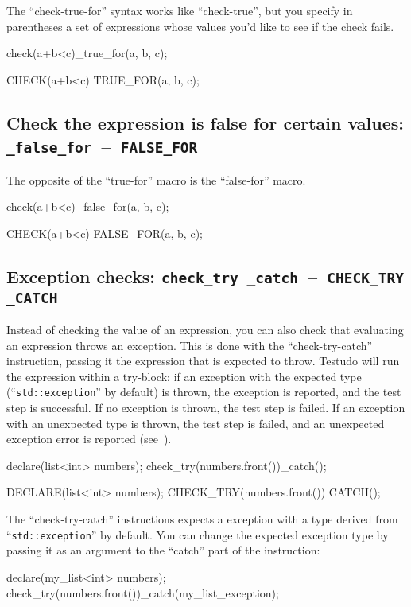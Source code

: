 \documentclass[twoside, a4paper, article]{memoir}
\newcommand*\testudocolor{\color{red!80!blue}}
\newcommand*\testudo[1]{\texttt{\testudocolor{}#1}}
\newcommand*\testudopair[2]{\testudo{#1}~--~\testudo{#2}}
\newcommand\subsectiontestudopair[3]{%
  \subsection[#1]{#1: \testudopair{#2}{#3}}}
\begin{document}
The ``check-true-for'' syntax works like ``check-true'', but you specify in
parentheses a set of expressions whose values you'd like to see if the check
fails.

\begin{cpplisting}
check(a+b<c)_true_for(a, b, c);
\end{cpplisting}

\begin{cpplisting}
CHECK(a+b<c) TRUE_FOR(a, b, c);
\end{cpplisting}

\subsectiontestudopair{Check the expression is false for certain values}%
{\_false\_for}{FALSE\_FOR}
\label{sec:check-expression-false-for}

The opposite of the ``true-for'' macro is the ``false-for'' macro.

\begin{cpplisting}
check(a+b<c)_false_for(a, b, c);
\end{cpplisting}

\begin{cpplisting}
CHECK(a+b<c) FALSE_FOR(a, b, c);
\end{cpplisting}


\subsectiontestudopair{Exception checks}%
  {check\_try \_catch}{CHECK\_TRY \_CATCH}
\label{sec:exception-checks}

Instead of checking the value of an expression, you can also check that
evaluating an expression throws an exception.  This is done with the
``check-try-catch'' instruction, passing it the expression that is expected to
throw.  Testudo will run the expression within a try-block; if an exception
with the expected type (``\texttt{std::exception}'' by default) is thrown, the
exception is reported, and the test step is successful.  If no exception is
thrown, the test step is failed. If an exception with an unexpected type is
thrown, the test step is failed, and an unexpected exception error is reported
(see~).

\begin{cpplisting}
declare(list<int> numbers);
check_try(numbers.front())_catch();
\end{cpplisting}

\begin{cpplisting}
DECLARE(list<int> numbers);
CHECK_TRY(numbers.front()) CATCH();
\end{cpplisting}

The ``check-try-catch'' instructions expects a exception with a type derived
from ``\texttt{std::exception}'' by default.  You can change the expected
exception type by passing it as an argument to the ``catch'' part of the
instruction:
\begin{cpplisting}
declare(my_list<int> numbers);
check_try(numbers.front())_catch(my_list_exception);
\end{cpplisting}
\end{document}
